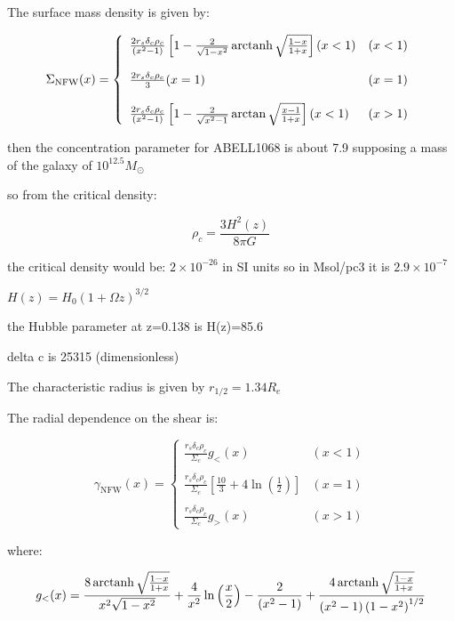 The surface mass density is given by:

\begin{equation}
\Sigma_{\text{NFW}}(x) = \left\lbrace
\begin{array}{lll}
\frac{2r_{s}\delta_{c}\rho_{c}}{\left(x^{2}-1\right)}\left[1-\frac{2}{\sqrt{1-x^{2}}}\operatorname{arctanh}\sqrt{\frac{1-x}{1+x}}\right](x<1) & (x<1)\\\\
\frac{2r_{s}\delta_{c}\rho_{c}}{3}(x=1) & (x=1)\\\\
\frac{2r_{s}\delta_{c}\rho_{c}}{\left(x^{2}-1\right)}\left[1-\frac{2}{\sqrt{x^{2}-1}}\arctan\sqrt{\frac{x-1}{1+x}}\right](x<1) & (x>1)
\end{array}
\right.
\end{equation} 

then the concentration parameter for ABELL1068 is about 7.9 supposing a mass of the galaxy of $10^{12.5}M_{\odot}$

so from the critical density:

\begin{equation}
\rho_{c}=\frac{3H^2(z)}{8\pi G}
\end{equation}

the critical density would be: $2\times 10^{-26}$ in SI units so in Msol/pc3 it is $2.9\times 10^{-7}$

$H(z)=H_{0}(1+\Omega z)^{3/2}$

the Hubble parameter at z=0.138 is H(z)=85.6

delta c is 25315 (dimensionless)

The characteristic radius is given by $r_{1/2}=1.34R_{e}$

The radial dependence on the shear is:

\begin{equation}
\gamma_{\text{NFW}}(x) = \left\lbrace
\begin{array}{lll}
\frac{r_{s}\delta_{c}\rho_{c}}{\Sigma_c}g_{<}(x) & (x<1)\\\\
\frac{r_{s}\delta_{c}\rho_{c}}{\Sigma_c}\left[\frac{10}{3}+4 \ln \left(\frac{1}{2}\right)\right] & (x=1)\\\\
\frac{r_{s}\delta_{c}\rho_{c}}{\Sigma_c}g_{>}(x) & (x>1)
\end{array}
\right.
\end{equation} 

where: 

\begin{equation}
g_{<}(x)=\frac{8 \operatorname{arctanh} \sqrt{\frac{1-x}{1+x}}}{x^{2}\sqrt{1-x^{2}}}+\frac{4}{x^{2}} \ln \left(\frac{x}{2}\right)-\frac{2}{\left(x^{2}-1\right)}+\frac{4 \operatorname{arctanh} \sqrt{\frac{1-x}{1+x}}}{\left(x^{2}-1\right)\left(1-x^{2}\right)^{1/2}}
\end{equation}

